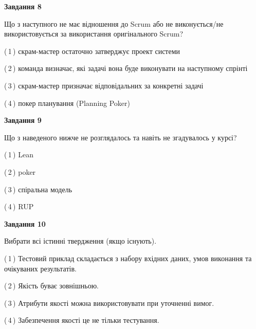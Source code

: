 \documentclass[10pt, ukrainian]{article}
\begin{document}
{\begin {large}
{\begin {center}\textbf{Завдання 8}\end {center}}\par
Що з наступного не має відношення до Scrum або не виконується/не використовується за використання оригінального Scrum?\par
\vspace{2mm}



(\,1\,) скрам-мастер остаточно затверджує проект системи%



(\,2\,) команда визначає, які задачі вона буде виконувати на наступному спрінті%



(\,3\,) скрам-мастер призначає відповідальних за конкретні задачі%



(\,4\,) покер планування (Planning Poker)%


{\begin {center}\textbf{Завдання 9}\end {center}}\par
Що з наведеного нижче не розглядалось та навіть не згадувалось у курсі?\par
\vspace{2mm}



(\,1\,) Lean%



(\,2\,) poker%



(\,3\,) спіральна модель%



(\,4\,) RUP%


{\begin {center}\textbf{Завдання 10}\end {center}}\par
Вибрати всі істинні твердження (якщо існують).\par
\vspace{2mm}



(\,1\,) Тестовий приклад складається з набору вхідних даних, умов виконання та очікуваних результатів.%



(\,2\,) Якість буває зовнішньою.%



(\,3\,) Атрибути якості можна використовувати при уточненні вимог.%



(\,4\,) Забезпечення якості це не тільки тестування.%



\end {large}}
\end{document}
